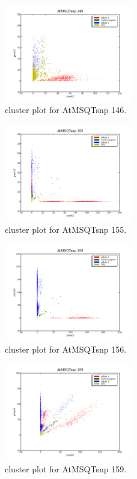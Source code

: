 \begin{figure}[H]
\includegraphics[width=0.5\textwidth]{figures/cluster_plot_AtMSQTsnp_146.png}
\caption{cluster plot for AtMSQTsnp 146.} \label{flAtMSQTsnp146}
\end{figure}

\begin{figure}[H]
\includegraphics[width=0.5\textwidth]{figures/cluster_plot_AtMSQTsnp_155.png}
\caption{cluster plot for AtMSQTsnp 155.} \label{flAtMSQTsnp155}
\end{figure}

\begin{figure}[H]
\includegraphics[width=0.5\textwidth]{figures/cluster_plot_AtMSQTsnp_156.png}
\caption{cluster plot for AtMSQTsnp 156.} \label{flAtMSQTsnp156}
\end{figure}

\begin{figure}[H]
\includegraphics[width=0.5\textwidth]{figures/cluster_plot_AtMSQTsnp_159.png}
\caption{cluster plot for AtMSQTsnp 159.} \label{flAtMSQTsnp159}
\end{figure}

